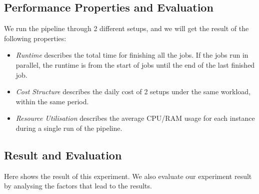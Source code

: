 \subsection{Performance Properties and Evaluation}
We run the pipeline through 2 different setups, and we will get the result of the following properties:
\begin{itemize}
\item \textit{Runtime} describes the total time for finishing all the jobs. If the jobs run in parallel, the runtime is from the start of jobs until the end of the last finished job.
\item \textit{Cost Structure} describes the daily cost of 2 setups under the same workload, within the same period.
\item \textit{Resource Utilisation} describes the average CPU/RAM usage for each instance during a single run of the pipeline.
\end{itemize}
\subsection{Result and Evaluation}
Here shows the result of this experiment. We also evaluate our experiment result by analysing the factors that lead to the results.
